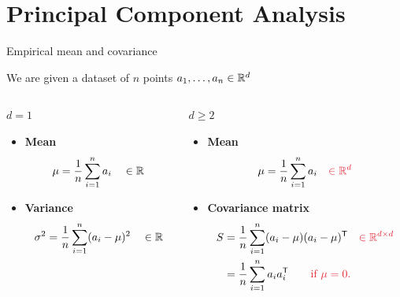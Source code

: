 \documentclass{beamer}
\begin{document}
\section{Principal Component Analysis}
\begin{frame}[t]{Empirical mean and covariance}
	\grid

	We are given a dataset of $n$ points $a_1, \dots, a_n \in \mathbb{R}^d$
	\vspace*{0.4cm}
	\begin{columns}
		\hspace*{-0.6cm}
		\begin{column}{0.45\textwidth}
			\vspace*{-1.7cm}
			\begin{center}
				\underline{$d=1$}
			\end{center}

			\begin{itemize}
				\item \textbf{Mean}
					$$
					\mu = \frac{1}{n}\sum_{i=1}^n a_i \quad \in \mathbb{R}
					$$
				\item \textbf{Variance}
					$$
					\sigma^2 = \frac{1}{n} \sum_{i=1}^n (a_i - \mu)^2 \quad \in \mathbb{R}
					$$
			\end{itemize}
		\end{column}
		\vrule
		\begin{column}{0.5\textwidth}
			\vspace*{-0.5cm}
			\pause
			\begin{center}
				\underline{$d \geq 2$}
			\end{center}
			\begin{itemize}
				\item \textbf{Mean}
					$$
					\mu = \frac{1}{n}\sum_{i=1}^n a_i \quad {\color{ExecusharesRed} \in \R^d}
					$$
				\item \textbf{Covariance matrix}
					\begin{align*}
						S &= \frac{1}{n} \sum_{i=1}^n (a_i - \mu)(a_i - \mu)^{\sT} \quad {\color{ExecusharesRed} \in \R^{d \times d}}
						\\
						  &= \frac{1}{n} \sum_{i=1}^n a_i a_i ^{\sT} \qquad {\color{ExecusharesRed} \text{if  } \mu=0.}
					\end{align*}
			\end{itemize}
		\end{column}
	\end{columns}
\end{frame}
\end{document}
